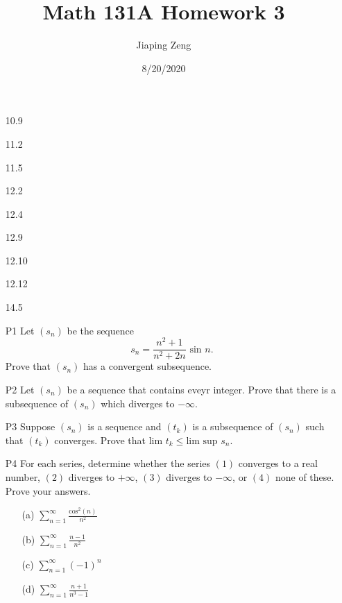 \documentclass{article}
\title{Math 131A Homework 3}
\date{8/20/2020}
\author{Jiaping Zeng}
\begin{document}
\maketitle

\begin{itemize}
    \item [10.9]
    \item [11.2]
    \item [11.5]
    \item [12.2]
    \item [12.4]
    \item [12.9]
    \item [12.10]
    \item [12.12]
    \item [14.5]
    \item [P1] Let $(s_n)$ be the sequence \[s_n=\dfrac{n^2+1}{n^2+2n}\text{ sin }n.\] Prove that $(s_n)$ has a convergent subsequence.
    \item [P2] Let $(s_n)$ be a sequence that contains eveyr integer. Prove that there is a subsequence of $(s_n)$ which diverges to $-\infty$.
    \item [P3] Suppose $(s_n)$ is a sequence and $(t_k)$ is a subsequence of $(s_n)$ such that $(t_k)$ converges. Prove that $\text{lim }t_k\leq\text{lim sup }s_n$.
    \item [P4] For each series, determine whether the series $(1)$ converges to a real number, $(2)$ diverges to $+\infty$, $(3)$ diverges to $-\infty$, or $(4)$ none of these. Prove your answers.
          \begin{itemize}
              \item [(a)] $\sum_{n=1}^\infty \frac{\text{cos}^2(n)}{n^2}$
              \item [(b)] $\sum_{n=1}^\infty \frac{n-1}{n^2}$
              \item [(c)] $\sum_{n=1}^\infty (-1)^n$
              \item [(d)] $\sum_{n=1}^\infty \frac{n+1}{n^3-1}$
          \end{itemize}
\end{itemize}
\end{document}
